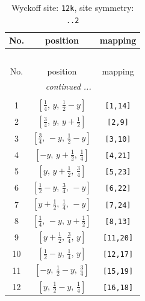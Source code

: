 \documentclass[fleqn,8pt]{jsarticle}
\begin{document}
\begin{longtable}{ccc}
\caption{Wyckoff site: {\tt 12k}, site symmetry: {\tt ..2}}
 \\
 \hline \hline
No. & position & mapping \\ \hline \endfirsthead

\multicolumn{2}{l}{\tablename\ \thetable{}} \\
 \hline \hline
No. & position & mapping \\ \hline \endhead

 \hline \hline
\multicolumn{2}{r}{\footnotesize\it continued ...} \\ \endfoot

 \hline \hline
\multicolumn{2}{r}{} \\ \endlastfoot

1 & $\left[ \frac{1}{4},\, y,\, \frac{1}{2} - y \right]$ & {\tt [1,14]} \\ \hline
2 & $\left[ \frac{3}{4},\, y,\, y + \frac{1}{2} \right]$ & {\tt [2,9]} \\ \hline
3 & $\left[ \frac{3}{4},\, - y,\, \frac{1}{2} - y \right]$ & {\tt [3,10]} \\ \hline
4 & $\left[ - y,\, y + \frac{1}{2},\, \frac{1}{4} \right]$ & {\tt [4,21]} \\ \hline
5 & $\left[ y,\, y + \frac{1}{2},\, \frac{3}{4} \right]$ & {\tt [5,23]} \\ \hline
6 & $\left[ \frac{1}{2} - y,\, \frac{3}{4},\, - y \right]$ & {\tt [6,22]} \\ \hline
7 & $\left[ y + \frac{1}{2},\, \frac{1}{4},\, - y \right]$ & {\tt [7,24]} \\ \hline
8 & $\left[ \frac{1}{4},\, - y,\, y + \frac{1}{2} \right]$ & {\tt [8,13]} \\ \hline
9 & $\left[ y + \frac{1}{2},\, \frac{3}{4},\, y \right]$ & {\tt [11,20]} \\ \hline
10 & $\left[ \frac{1}{2} - y,\, \frac{1}{4},\, y \right]$ & {\tt [12,17]} \\ \hline
11 & $\left[ - y,\, \frac{1}{2} - y,\, \frac{3}{4} \right]$ & {\tt [15,19]} \\ \hline
12 & $\left[ y,\, \frac{1}{2} - y,\, \frac{1}{4} \right]$ & {\tt [16,18]} \\
\end{longtable}
\renewcommand{\arraystretch}{1.2}
\end{document}
